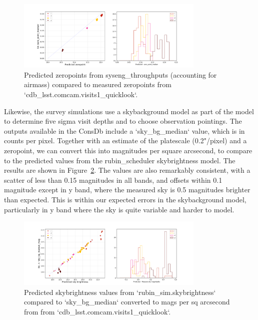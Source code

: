 \begin{figure}
    \centering
    \includegraphics[width=0.8\textwidth]{sp/zeropoints.png}
    \caption{Predicted zeropoints from syseng\_throughputs (accounting for airmass) compared to measured zeropoints from `cdb\_lsst.comcam.visits1\_quicklook`.}
    \label{fig:zeropoints}
    \end{figure}
    
    
Likewise, the survey simulations use a skybackground model as part of the model to determine five sigma visit depths and to choose observation pointings. The outputs available in the ConsDb include a `sky\_bg\_median` value, which is in counts per pixel. Together with an estimate of the platescale (0.2"/pixel) and a zeropoint, we can convert this into magnitudes per square arcsecond, to compare to the predicted values from the rubin\_scheduler skybrightness model. The results are shown in Figure~\ref{fig:sky}.  The values are also remarkably consistent, with a scatter of less than 0.15 magnitudes in all bands, and offsets within 0.1 magnitude except in y band, where the measured sky is 0.5 magnitudes brighter than expected. This is  within our expected errors in the skybackground model, particularly in y band where the sky is quite variable and harder to model. 

\begin{figure}
    \centering
    \includegraphics[width=0.8\textwidth]{sp/sky.png}
    \caption{Predicted skybrightness values from `rubin\_sim.skybrightness`  compared to `sky\_bg\_median` converted to mags per sq arcsecond  from  from `cdb\_lsst.comcam.visits1\_quicklook`.}
    \label{fig:sky}
    \end{figure}
    
